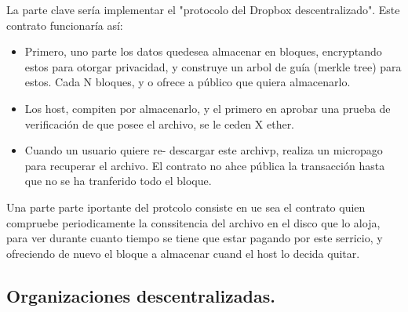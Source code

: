 \documentclass[11pt,a4paper]{article}
\begin{document}
La parte clave sería implementar el "protocolo del Dropbox descentralizado". Este contrato funcionaría así:
\begin{itemize}
	\item Primero, uno parte los datos quedesea almacenar en bloques, encryptando estos para otorgar privacidad, y construye un arbol de guía (merkle tree) para estos. Cada N bloques, y o ofrece a público que quiera almacenarlo.
	\item Los host, compiten por almacenarlo, y el primero en aprobar una prueba de verificación de que posee el archivo, se le ceden X ether.
	\item Cuando un usuario quiere re- descargar este archivp, realiza un micropago para recuperar el archivo. El contrato no ahce pública la transacción hasta que no  se ha tranferido todo el bloque.
	
\end{itemize}

Una parte parte iportante del protcolo consiste en ue sea el contrato quien compruebe periodicamente la conssitencia del archivo en el disco que lo aloja, para ver durante cuanto tiempo se tiene que estar pagando por este serricio, y ofreciendo de nuevo el bloque a almacenar cuand el host lo decida quitar.

\subsection{Organizaciones descentralizadas.}
\end{document}
